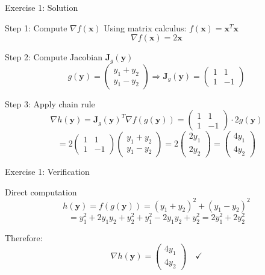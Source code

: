 \documentclass[aspectratio=1610]{beamer}
\begin{document}
\begin{frame}{Exercise 1: Solution}
  \begin{block}{Step 1: Compute $\nabla f(\mathbf{x})$}
    Using matrix calculus: $f(\mathbf{x}) = \mathbf{x}^T\mathbf{x}$
    $$\nabla f(\mathbf{x}) = 2\mathbf{x}$$
  \end{block}
  
  \begin{block}{Step 2: Compute Jacobian $\mathbf{J}_g(\mathbf{y})$}
    $$g(\mathbf{y}) = \begin{pmatrix} y_1 + y_2 \\ y_1 - y_2 \end{pmatrix} \Rightarrow \mathbf{J}_g(\mathbf{y}) = \begin{pmatrix} 1 & 1 \\ 1 & -1 \end{pmatrix}$$
  \end{block}
  
  \begin{block}{Step 3: Apply chain rule}
    $$\nabla h(\mathbf{y}) = \mathbf{J}_g(\mathbf{y})^T \nabla f(g(\mathbf{y})) = \begin{pmatrix} 1 & 1 \\ 1 & -1 \end{pmatrix} \cdot 2g(\mathbf{y})$$
    $$= 2\begin{pmatrix} 1 & 1 \\ 1 & -1 \end{pmatrix}\begin{pmatrix} y_1 + y_2 \\ y_1 - y_2 \end{pmatrix} = 2\begin{pmatrix} 2y_1 \\ 2y_2 \end{pmatrix} = \begin{pmatrix} 4y_1 \\ 4y_2 \end{pmatrix}$$
  \end{block}
\end{frame}

\begin{frame}{Exercise 1: Verification}
  \begin{block}{Direct computation}
    $$h(\mathbf{y}) = f(g(\mathbf{y})) = (y_1 + y_2)^2 + (y_1 - y_2)^2$$
    $$= y_1^2 + 2y_1y_2 + y_2^2 + y_1^2 - 2y_1y_2 + y_2^2 = 2y_1^2 + 2y_2^2$$
    
    Therefore:
    $$\nabla h(\mathbf{y}) = \begin{pmatrix} 4y_1 \\ 4y_2 \end{pmatrix} \quad \checkmark$$
  \end{block}
\end{frame}
\end{document}
